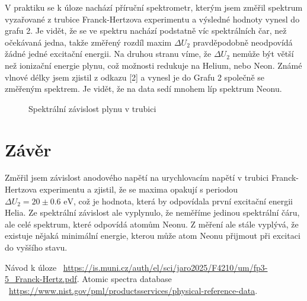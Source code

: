 \documentclass[a4paper,11pt]{article}
\begin{document}
V praktiku se k úloze nachází příruční spektrometr, kterým jsem změřil spektrum vyzařované z trubice Franck-Hertzova experimentu a výsledné hodnoty vynesl do grafu 2. Je vidět, že se ve spektru nachází podstatně víc spektrálních čar, než očekávaná jedna, takže změřený rozdíl maxim $ \Delta U_2 $ pravděpodobně neodpovídá žádné jedné excitační energii. Na druhou stranu víme, že $ \Delta U_2 $ nemůže být větší než ionizační energie plynu, což možnosti redukuje na Helium, nebo Neon. Známé vlnové délky jsem zjistil z odkazu [2] a vynesl je do Grafu 2 společně se změřeným spektrem. Je vidět, že na data sedí mnohem líp spektrum Neonu.

\begin{figure}[htpb]
    \centering
    
    \captionsetup{type=graph}
    \caption{Spektrální závislost plynu v trubici}
\end{figure}

\section{Závěr}

Změřil jsem závislost anodového napětí na urychlovacím napětí v trubici Franck-Hertzova experimentu a zjistil, že se maxima opakují s periodou $ \Delta U_2 = 20 \pm 0.6 \text{ eV} $, což je hodnota, která by odpovídala první excitační energii Helia. Ze spektrální závislost ale vyplynulo, že neměříme jedinou spektrální čáru, ale celé spektrum, které odpovídá atomům Neonu. Z měření ale stále vyplývá, že existuje nějaká minimální energie, kterou může atom Neonu přijmout při excitaci do vyššího stavu.  

\begin{thebibliography}{0}
 Návod k úloze ~\url{https://is.muni.cz/auth/el/sci/jaro2025/F4210/um/fp3-5_Franck-Hertz.pdf}.   
 Atomic spectra database  \\ ~\url{https://www.nist.gov/pml/productsservices/physical-reference-data}.   
\end{thebibliography}
\end{document}
